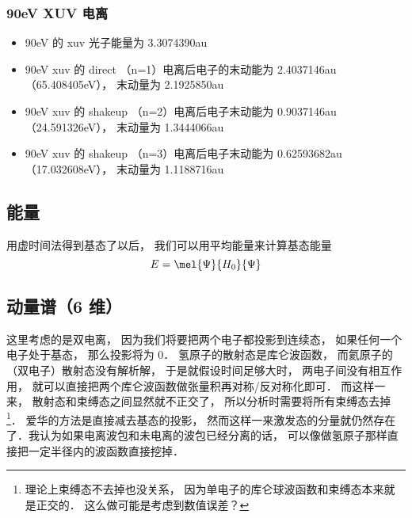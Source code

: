 \subsubsection{90eV XUV 电离}
\begin{itemize}
\item 90eV 的 xuv 光子能量为 3.3074390au

\item 90eV xuv 的 direct （n=1）电离后电子的末动能为 2.4037146au（65.408405eV）， 末动量为 2.1925850au

\item 90eV xuv 的 shakeup （n=2）电离后电子末动能为 0.9037146au （24.591326eV）， 末动量为 1.3444066au

\item 90eV xuv 的 shakeup （n=3）电离后电子末动能为 0.62593682au （17.032608eV）， 末动量为 1.1188716au
\end{itemize}

\subsection{能量}
用虚时间法得到基态了以后， 我们可以用平均能量来计算基态能量
\begin{equation}
E = \mel{\Psi}{H_0}{\Psi}
\end{equation}

\subsection{动量谱（6 维）}
这里考虑的是双电离， 因为我们将要把两个电子都投影到连续态， 如果任何一个电子处于基态， 那么投影将为 0． 氢原子的散射态是库仑波函数， 而氦原子的（双电子）散射态没有解析解， 于是就假设时间足够大时， 两电子间没有相互作用， 就可以直接把两个库仑波函数做张量积再对称/反对称化即可． 而这样一来， 散射态和束缚态之间显然就不正交了， 所以分析时需要将所有束缚态去掉\footnote{理论上束缚态不去掉也没关系， 因为单电子的库仑球波函数和束缚态本来就是正交的． 这么做可能是考虑到数值误差？}． 爱华的方法是直接减去基态的投影， 然而这样一来激发态的分量就仍然存在了．我认为如果电离波包和未电离的波包已经分离的话， 可以像做氢原子那样直接把一定半径内的波函数直接挖掉．

